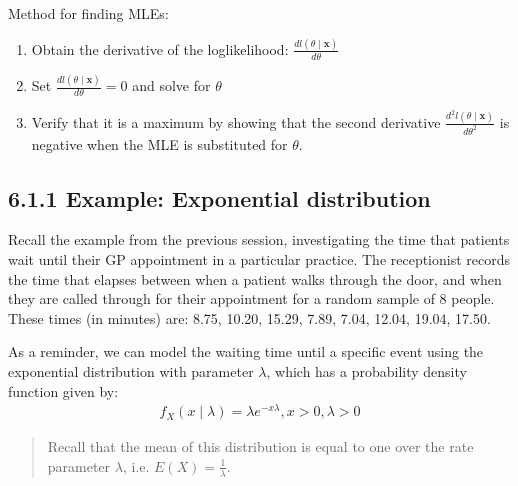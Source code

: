 \documentclass[letterpaper,10pt,english]{jupyterBook}
\begin{document}
\sphinxAtStartPar
 Method for finding MLEs:
\begin{enumerate}
%
\item {} 
\sphinxAtStartPar
Obtain the derivative of the log\sphinxhyphen{}likelihood: \(\frac{d l(\theta \mid \mathbf{x})}{d \theta}\)

\item {} 
\sphinxAtStartPar
Set \(\frac{d l(\theta \mid \mathbf{x})}{d \theta}=0\) and solve for \(\theta\)

\item {} 
\sphinxAtStartPar
Verify that it is a maximum by showing that the second derivative \(\frac{d ^2 l(\theta \mid  \mathbf{x})}{d \theta ^2 }\) is negative when the MLE is substituted for \(\theta\).

\end{enumerate}




\subsection{6.1.1 Example: Exponential distribution}
\label{\detokenize{06.b. Maximum Likelihood:example-exponential-distribution}}
\sphinxAtStartPar
Recall the example from the previous session, investigating the time that patients wait until their GP appointment in a particular practice. The receptionist records the time that elapses between when a patient walks through the door, and when they are called through for their appointment for a random sample of 8 people. These times (in minutes) are: 8.75, 10.20, 15.29, 7.89, 7.04, 12.04, 19.04, 17.50.

\sphinxAtStartPar
As a reminder, we can model the waiting time until a specific event using the exponential distribution with parameter \(\lambda\), which has a probability density function given by:
\begin{equation*}
\begin{split}
\begin{equation}  
f _X\left(x \mid \lambda \right)=\lambda e^{-x\lambda} , x > 0, \lambda > 0  
\end{equation}
\end{split}
\end{equation*}\begin{quote}

\sphinxAtStartPar
Recall that the mean of this distribution is equal to one over the rate parameter \(\lambda\), i.e. \(E(X) = \frac{1}{\lambda}\).
\end{quote}
\end{document}
